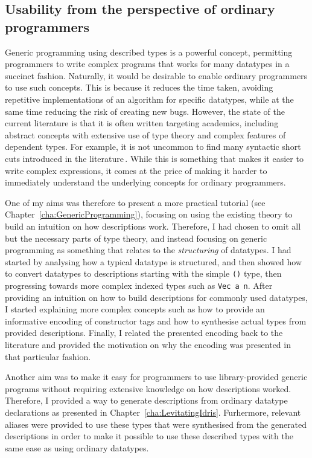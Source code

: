 \documentclass{ituthesis}
\newcommand{\tttype}[1]{\textcolor{type-color}{\texttt{#1}}}
\newcommand{\ttvar}[1]{\textcolor{local-var-color}{\texttt{#1}}}
\theoremstyle{break}
\begin{document}
\subsection{Usability from the perspective of ordinary programmers}
\label{sub:Usabilityfromtheperspectiveofordinaryprogrammers}
Generic programming using described types is a powerful concept, permitting programmers to write complex programs that works for many datatypes in a succinct fashion.
Naturally, it would be desirable to enable ordinary programmers to use such concepts.
This is because it reduces the time taken, avoiding repetitive implementations of an algorithm for specific datatypes, while at the same time reducing the risk of creating new bugs.
However, the state of the current literature is that it is often written targeting academics, including abstract concepts with extensive use of type theory and complex features of dependent types.
For example, it is not uncommon to find many syntactic short cuts introduced in the literature\,\autocite{Chapman:2010:GAL:1863543.1863547,mcbride2010ornamental}.
While this is something that makes it easier to write complex expressions, it comes at the price of making it harder to immediately understand the underlying concepts for ordinary programmers.

One of my aims was therefore to present a more practical tutorial (see Chapter~\ref{cha:GenericProgramming}), focusing on using the existing theory to build an intuition on how descriptions work.
Therefore, I had chosen to omit all but the necessary parts of type theory, and instead focusing on generic programming as something that relates to the \textit{structuring} of datatypes.
I had started by analysing how a typical datatype is structured, and then showed how to convert datatypes to descriptions starting with the simple \tttype{()} type, then progressing towards more complex indexed types such as \tttype{Vec}~\ttvar{a}~\ttvar{n}.
After providing an intuition on how to build descriptions for commonly used datatypes, I started explaining more complex concepts such as how to provide an informative encoding of constructor tags and how to synthesise actual types from provided descriptions.
Finally, I related the presented encoding back to the literature and provided the motivation on why the encoding was presented in that particular fashion.

Another aim was to make it easy for programmers to use library-provided generic programs without requiring extensive knowledge on how descriptions worked.
Therefore, I provided a way to generate descriptions from ordinary datatype declarations as presented in Chapter~\ref{cha:LevitatingIdris}.
Furhermore, relevant aliases were provided to use these types that were synthesised from the generated descriptions in order to make it possible to use these described types with the same ease as using ordinary datatypes.
\end{document}
